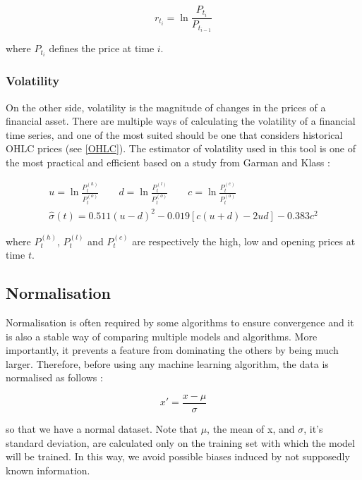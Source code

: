 \documentclass[11pt,a4paper,oneside]{book}
\begin{document}
\begin{equation}
r_{t_i} = \ln\frac{P_{t_i}}{P_{t_{i-1}}}
\end{equation}

where $P_{t_i}$ defines the price at time $i$.

\subsubsection{Volatility}\label{vol}

On the other side, volatility is the magnitude of changes in the prices of a financial asset. There are multiple ways of calculating the volatility of a financial time series, and one of the most suited should be one that considers historical OHLC prices (see \ref{OHLC}). The estimator of volatility used in this tool is one of the most practical and efficient based on a study from Garman and Klass \cite{garm}:

\begin{equation}\label{volatility}
\begin{matrix}
u = \ln\frac{P_t^{(h)}}{P_t^{(o)}} \qquad
d = \ln\frac{P_t^{(l)}}{P_t^{(o)}} \qquad
c = \ln\frac{P_t^{(c)}}{P_t^{(o)}} \\
\hat{\sigma}\left ( t \right ) = 0.511\left ( u - d \right )^2 - 0.019\left [ c\left (u + d\right ) - 2ud\right ] - 0.383c^2
\end{matrix}
\end{equation}

where $P_t^{(h)}$, $P_t^{(l)}$ and $P_t^{(c)}$ are respectively the high, low and opening prices at time $t$.


\subsection{Normalisation}

Normalisation is often required by some algorithms to ensure convergence and it is also a stable way of comparing multiple models and algorithms. More importantly, it prevents a feature from dominating the others by being much larger. Therefore, before using any machine learning algorithm, the data is normalised as follows : 

\begin{equation}
{x}' = \frac{x - \mu }{\sigma }
\end{equation}

so that we have a normal dataset. Note that $\mu$, the mean of x, and $\sigma$, it's standard deviation, are calculated only on the training set with which the model will be trained. In this way, we avoid possible biases induced by not supposedly known information.
\end{document}
